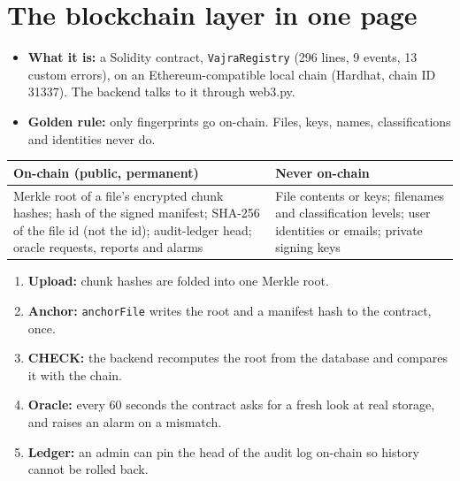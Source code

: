 \documentclass[10pt,a4paper]{article}
\newcommand{\code}[1]{\texttt{#1}}
\begin{document}
\section{The blockchain layer in one page}
\begin{itemize}
  \item \textbf{What it is:} a Solidity contract, \code{VajraRegistry} (296 lines, 9 events, 13 custom errors), on an
        Ethereum-compatible local chain (Hardhat, chain ID 31337). The backend talks to it through web3.py.
  \item \textbf{Golden rule:} only fingerprints go on-chain. Files, keys, names, classifications and identities never do.
\end{itemize}
\begin{center}
\small
\begin{tabular}{@{}p{8.0cm}p{8.0cm}@{}}
\toprule
\textbf{On-chain (public, permanent)} & \textbf{Never on-chain} \\
\midrule
Merkle root of a file's encrypted chunk hashes; hash of the signed manifest; SHA-256 of the file id (not the id);
audit-ledger head; oracle requests, reports and alarms
& File contents or keys; filenames and classification levels; user identities or emails; private signing keys \\
\bottomrule
\end{tabular}
\end{center}
\begin{enumerate}
  \item \textbf{Upload:} chunk hashes are folded into one Merkle root.
  \item \textbf{Anchor:} \code{anchorFile} writes the root and a manifest hash to the contract, once.
  \item \textbf{CHECK:} the backend recomputes the root from the database and compares it with the chain.
  \item \textbf{Oracle:} every 60 seconds the contract asks for a fresh look at real storage, and raises an alarm on a mismatch.
  \item \textbf{Ledger:} an admin can pin the head of the audit log on-chain so history cannot be rolled back.
\end{enumerate}

\end{document}
